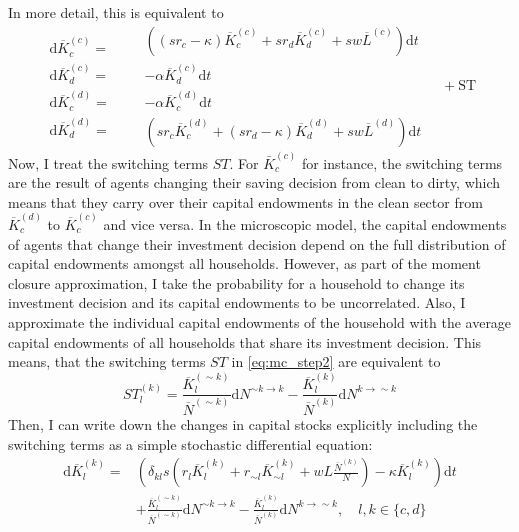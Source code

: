 In more detail, this is equivalent to 
\begin{equation}
      \begin{aligned}
          \mathrm{d}\overbar{K}_c^{(c)} =&  \\
          \mathrm{d}\overbar{K}_d^{(c)} =&  \\
          \mathrm{d}\overbar{K}_c^{(d)} =&  \\
          \mathrm{d}\overbar{K}_d^{(d)} =& 
      \end{aligned}
      \begin{aligned}
        &\left((sr_c - \kappa)\overbar{K}_c^{(c)} + s r_d \overbar{K}_d^{(c)} + s w \overbar{L}^{(c)}\right) \mathrm{d}t \\
      &- \alpha\overbar{K}_d^{(c)}  \mathrm{d}t\\
      &- \alpha\overbar{K}_c^{(d)}  \mathrm{d}t\\
      &\left(sr_c \overbar{K}_c^{(d)} + (s r_d - \kappa)\overbar{K}_d^{(d)} + s w \overbar{L}^{(d)}\right) \mathrm{d}t
      \end{aligned} \quad + \mathrm{ST} \label{eq:sterm0}
\end{equation}
Now, I treat the switching terms $ST$. For $\bar{K}_c^{(c)}$ for instance, the switching terms are the result of agents changing their saving decision from clean to dirty, which means that they carry over their capital endowments in the clean sector from $\overbar{K}_c^{(d)}$ to $\overbar{K}_c^{(c)}$ and vice versa. In the microscopic model, the capital endowments of agents that change their investment decision depend on the full distribution of capital endowments amongst all households. 
However, as part of the moment closure approximation, I take the probability for a household to change its investment decision and its capital endowments to be uncorrelated.
Also, I approximate the individual capital endowments of the household with the average capital endowments of all households that share its investment decision. This means, that the switching terms $ST$ in \cref{eq:mc_step2} are equivalent to
\begin{equation}
  ST_{l}^{(k)}  =  \frac{\overbar{K}_l^{(\sim k)}}{\overbar{N}^{(\sim k)}} \mathrm{ d} N^{\sim k \rightarrow k} -  \frac{\overbar{K}_l^{(k)}}{\overbar{N}^{(k)}} \mathrm{ d} N^{k \rightarrow \sim k}  \label{eq:switching_terms}
\end{equation}
Then, I can write down the changes in capital stocks explicitly including the switching terms as a simple stochastic differential equation:
\begin{align}
  \mathrm{d}\overbar{K}_{l}^{(k)} = &  \left(\delta_{kl} s\left( r_l \overbar{K}_l^{(k)} + r_{\sim l} \overbar{K}_{\sim l}^{(k)} + w  L \frac{\overbar{N}^{(k)}}{N} \right) - \kappa \overbar{K}_l^{(k)} \right)\mathrm{d}t \nonumber \\
  &+  \frac{\overbar{K}_l^{(\sim k)}}{\overbar{N}^{(\sim k)}} \mathrm{ d} N^{\sim k \rightarrow k} -  \frac{\overbar{K}_l^{(k)}}{\overbar{N}^{(k)}} \mathrm{ d} N^{k \rightarrow \sim k}, \quad l, k \in \{c, d\}
	\label{eq:aggregated_capital_time_derivative}
\end{align}
